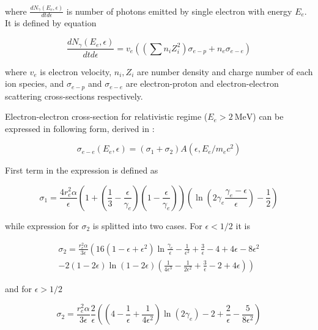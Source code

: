 where $\frac{dN_{\gamma}\left(E_e, \epsilon\right)}{dt d\epsilon}$ is number of photons emitted by single electron with energy $E_e$. It is defined by equation

\begin{equation}
	\frac{dN_{\gamma}\left(E_e, \epsilon\right)}{dt d\epsilon} = v_e \left(\left(\sum n_i Z_i^2\right)\sigma_{e-p} + n_e\sigma_{e-e}\right)
\end{equation}

where $v_e$ is electron velocity, $n_i, Z_i$ are number density and charge number of each ion species, and $\sigma_{e-p}$ and $\sigma_{e-e}$ are electron-proton and electron-electron scattering cross-sections respectively.

Electron-electron cross-section for relativistic regime ($E_e > 2~\text{MeV}$) can be expressed in following form, derived in \cite{BaierJETP1967} :

\begin{equation}
\sigma_{e-e}(E_e,\epsilon) = \left(\sigma_1 + \sigma_2\right)A\left(\epsilon, E_e/m_e c^2\right)
\end{equation}

First term in the expression is defined as

\begin{equation}\label{sigma1}
	\sigma_1 = \frac{4 r_e^2 \alpha}{\epsilon}\left(1+\left(\frac{1}{3}-\frac{\epsilon}{\gamma_e}\right)\left(1-\frac{\epsilon}{\gamma_e}\right)\right)\left(\ln\left(2\gamma_e\frac{\gamma_e - \epsilon}{\epsilon}\right)-\frac{1}{2}\right)
\end{equation}

while expression for $\sigma_2$ is splitted into two cases. For $\epsilon < 1/2$ it is

\begin{equation}
	\begin{split}
	\sigma_2 = \frac{r_e^2\alpha}{3\epsilon} \left( 16 \left( 1-\epsilon+\epsilon^2 \right) \ln\frac{\gamma_e}{\epsilon}-\frac{1}{\epsilon^2}+\frac{3}{\epsilon}-4+4\epsilon-8\epsilon^2 \right. \\ \left. - 2\left( 1-2\epsilon \right) \ln \left( 1-2\epsilon \right) \left( \frac{1}{4\epsilon^3}-\frac{1}{2\epsilon^2}+\frac{3}{\epsilon}-2+4\epsilon \right) \right)
	\end{split}
\end{equation}

and for $\epsilon > 1/2$

\begin{equation}
	\sigma_2 = \frac{r_e^2\alpha}{3\epsilon}\frac{2}{\epsilon}\left(\left(4-\frac{1}{\epsilon}+\frac{1}{4\epsilon^2}\right)\ln\left(2\gamma_e\right)-2+\frac{2}{\epsilon}-\frac{5}{8\epsilon^2}\right)
\end{equation}

